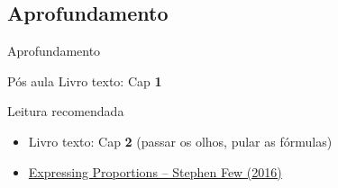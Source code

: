 \documentclass{beamer}
\begin{document}





\subsection{Aprofundamento}

\begin{frame}{\scriptsize Aprofundamento}
  \begin{block}{Pós aula}
    \footnotesize
    Livro texto: Cap {\bf 1}
  \end{block}
  \begin{block}{Leitura recomendada}
    \begin{itemize}
      \footnotesize
    \item Livro texto: Cap {\bf 2} ({\scriptsize passar os olhos, pular as fórmulas})
      \smallskip
    \item \href{http://www.perceptualedge.com/articles/visual_business_intelligence/expressing_proportions.pdf}{Expressing Proportions -- Stephen Few (2016)}
  \end{itemize}
  \end{block}
\end{frame}
\end{document}
